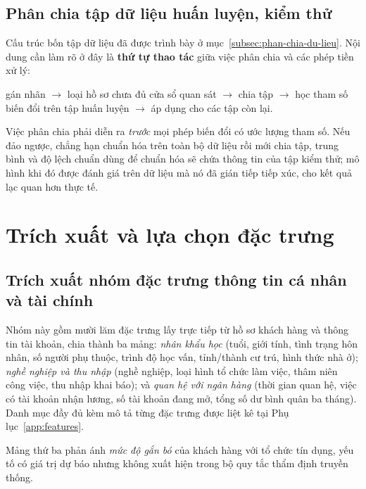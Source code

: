 \subsection{Phân chia tập dữ liệu huấn luyện, kiểm thử}
\label{subsec:chia-tap}

Cấu trúc bốn tập dữ liệu đã được trình bày ở mục~\ref{subsec:phan-chia-du-lieu}.
Nội dung cần làm rõ ở đây là \textbf{thứ tự thao tác} giữa việc phân chia và các
phép tiền xử lý:

\begin{center}
gán nhãn $\rightarrow$ loại hồ sơ chưa đủ cửa sổ quan sát $\rightarrow$ chia tập
$\rightarrow$ học tham số biến đổi trên tập huấn luyện $\rightarrow$ áp dụng cho
các tập còn lại.
\end{center}

Việc phân chia phải diễn ra \textit{trước} mọi phép biến đổi có ước lượng tham
số. Nếu đảo ngược, chẳng hạn chuẩn hóa trên toàn bộ dữ liệu rồi mới chia tập,
trung bình và độ lệch chuẩn dùng để chuẩn hóa sẽ chứa thông tin của tập kiểm thử;
mô hình khi đó được đánh giá trên dữ liệu mà nó đã gián tiếp tiếp xúc, cho kết
quả lạc quan hơn thực tế.

\section{Trích xuất và lựa chọn đặc trưng}
\label{sec:trich-xuat-dac-trung}

\subsection{Trích xuất nhóm đặc trưng thông tin cá nhân và tài chính}
\label{subsec:dac-trung-ca-nhan}

Nhóm này gồm mười lăm đặc trưng lấy trực tiếp từ hồ sơ khách hàng và thông tin
tài khoản, chia thành ba mảng: \textit{nhân khẩu học} (tuổi, giới tính, tình
trạng hôn nhân, số người phụ thuộc, trình độ học vấn, tỉnh/thành cư trú, hình
thức nhà ở); \textit{nghề nghiệp và thu nhập} (nghề nghiệp, loại hình tổ chức làm
việc, thâm niên công việc, thu nhập khai báo); và \textit{quan hệ với ngân hàng}
(thời gian quan hệ, việc có tài khoản nhận lương, số tài khoản đang mở, tổng số
dư bình quân ba tháng). Danh mục đầy đủ kèm mô tả từng đặc trưng được liệt kê tại
Phụ lục~\ref{app:features}.

Mảng thứ ba phản ánh \textit{mức độ gắn bó} của khách hàng với tổ chức tín dụng,
yếu tố có giá trị dự báo nhưng không xuất hiện trong bộ quy tắc thẩm định truyền
thống.

